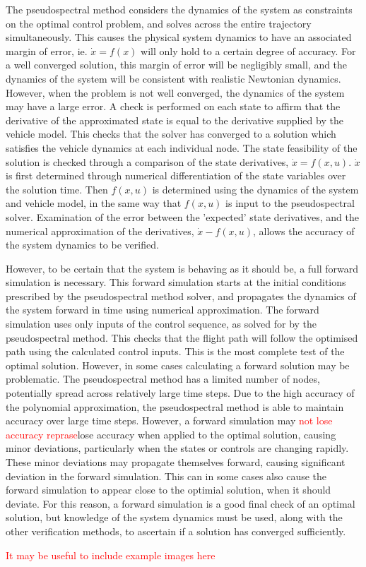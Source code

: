 The pseudospectral method considers the dynamics of the system as constraints on the optimal control problem, and solves across the entire trajectory simultaneously. This causes the physical system dynamics to have an associated margin of error, ie. $\dot{x} = f(x)$ will only hold to a certain degree of accuracy. For a well converged solution, this margin of error will be negligibly small, and the dynamics of the system will be consistent with realistic Newtonian dynamics. However, when the problem is not well converged, the dynamics of the system may have a large error.
A check is performed on each state to affirm that the derivative of the approximated state is equal to the derivative supplied by the vehicle model. This checks that the solver has converged to a solution which satisfies the vehicle dynamics at each individual node. 
The state feasibility of the solution is checked through a comparison of the state derivatives, $\dot{x} = f(x,u)$. $\dot{x}$ is first determined through numerical differentiation of the state variables over the solution time. Then $f(x,u)$ is determined using the dynamics of the system and vehicle model, in the same way that $f(x,u)$ is input to the pseudospectral solver. Examination of the error between the 'expected' state derivatives, and the numerical approximation of the derivatives, $\dot{x} - f(x,u)$, allows the accuracy of the system dynamics to be verified. 



 However, to be certain that the system is behaving as it should be, a full forward simulation is necessary. This forward simulation starts at the initial conditions prescribed by the pseudospectral method solver, and propagates the dynamics of the system forward in time using numerical approximation. The forward simulation uses only inputs of the control sequence, as solved for by the pseudospectral method. 
This checks that the flight path will follow the optimised path using the calculated control inputs. This is the most complete test of the optimal solution. However, in some cases calculating a forward solution may be problematic. The pseudospectral method has a limited number of nodes, potentially spread across relatively large time steps. Due to the high accuracy of the polynomial approximation, the pseudospectral method is able to maintain accuracy over large time steps. However, a forward simulation may \textcolor{red}{not lose accuracy reprase}lose accuracy when applied to the optimal solution, causing minor deviations, particularly when the states or controls are changing rapidly. These minor deviations may propagate themselves forward, causing significant deviation in the forward simulation. This can in some cases also cause the forward simulation to appear close to the optimial solution, when it should deviate. For this reason, a forward simulation is a good final check of an optimal solution, but knowledge of the system dynamics must be used, along with the other verification methods, to ascertain if a solution has converged sufficiently. 

\textcolor{red}{It may be useful to include example images here}

